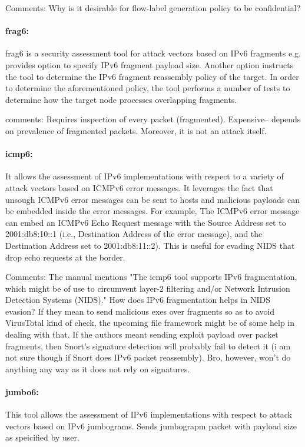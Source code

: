 \documentclass{article}
\begin{document}
Comments: Why is it desirable for flow-label generation policy to be confidential? 

\paragraph*{frag6:} frag6 is a security assessment tool for attack vectors based on IPv6 fragments e.g. provides option to specify IPv6 fragment payload size. Another option instructs the tool to determine the IPv6 fragment reassembly policy of the target. In
order to determine the aforementioned policy, the tool performs a number of tests to determine how
the target node processes overlapping fragments.

comments: Requires inspection of every packet (fragmented). Expensive-- depends on prevalence of fragmented packets. Moreover, it is not an attack itself.

\paragraph*{icmp6:} It allows the assessment of IPv6 implementations with respect to a variety of attack vectors based on ICMPv6 error messages. It leverages the fact that unsough ICMPv6 error messages can be sent to hosts and malicious payloads can be embedded inside the error messages. For example, The ICMPv6 error message can embed an ICMPv6 Echo Request message with the Source Address set to 2001:db8:10::1 (i.e., Destination Address of the error message), and
the Destination Address set to 2001:db8:11::2). This is useful for evading NIDS that drop echo requests at the border.

Comments: The manual mentions "The icmp6 tool supports IPv6 fragmentation, which might be of use to circumvent layer-2 filtering
and/or Network Intrusion Detection Systems (NIDS)." How does IPv6 fragmentation helps in NIDS evasion? If they mean to send malicious exes over fragments so as to avoid VirusTotal kind of check, the upcoming file framework might be of some help in dealing with that. If the authors meant sending exploit payload over packet fragments, then Snort's signature detection will probably fail to detect it (i am not sure though if Snort does IPv6 packet reassembly). Bro, however, won't do anything any way as it does not rely on signatures. 

\paragraph*{jumbo6:} This tool allows the assessment of IPv6 implementations with respect to attack vectors based on IPv6 jumbograms. Sends jumbograpm packet with payload size as speicified by user.
\end{document}
